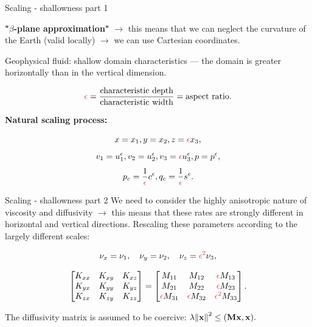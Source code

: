 \documentclass{beamer}
\begin{document}
\begin{frame}{Scaling - shallowness part 1}

\textbf{"$\beta$-plane approximation"} $\to$ this means that we can neglect the curvature of the Earth (valid locally) $\to$ we can use Cartesian coordinates.

Geophysical fluid: shallow domain characteristics --- the domain is greater horizontally than in the vertical dimension.

$$\textcolor{jasper}{\epsilon} = \frac{\text{characteristic depth}}{\text{characteristic width}} = \text{aspect ratio}.$$

\textbf{Natural scaling process:}

$$ x=x_1, y=x_2, z= \textcolor{jasper}{\epsilon} x_3,$$
$$ v_1 = u_1^{\epsilon}, v_2 = u_2^{\epsilon}, v_3 = \textcolor{jasper}{\epsilon} u_3^{\epsilon}, p = p^{\epsilon}, $$
$$ p_c = \frac{1}{\textcolor{jasper}{\epsilon}} c^\epsilon, q_c = \frac{1}{\textcolor{jasper}{\epsilon}} s^\epsilon. $$

\end{frame}

\begin{frame}{Scaling - shallowness part 2}
We need to consider the highly anisotropic nature of viscosity and diffusivity $\to$ this means that these rates are strongly different in horizontal and vertical directions.
Rescaling these parameters according to the largely different scales:


$$ \nu_x = \nu_1, \quad \nu_y = \nu_2 , \quad \nu_z = \textcolor{jasper}{\epsilon^2} \nu_3, $$

\begin{gather}
      \begin{bmatrix} K_{xx} & K_{xy} & K_{xz} \\ K_{yx} & K_{yy} & K_{yz} \\ K_{zx} & K_{zy} & K_{zz} \end{bmatrix}
       =
      \begin{bmatrix}
    M_{11} & M_{12} & \textcolor{jasper}{\epsilon} M_{13} \\ M_{21} & M_{22} & \textcolor{jasper}{\epsilon} M_{23} \\ \textcolor{jasper}{\epsilon} M_{31} & \textcolor{jasper}{\epsilon} M_{32} & \textcolor{jasper}{\epsilon^2} M_{33}
  \end{bmatrix}. \nonumber
\end{gather}

  
The diffusivity matrix is assumed to be coercive: $\lambda \norm{\mathbf{x}}^2 \leq (\mathbf{M} \mathbf{x}, \mathbf{x}).$

\end{frame}
\end{document}
